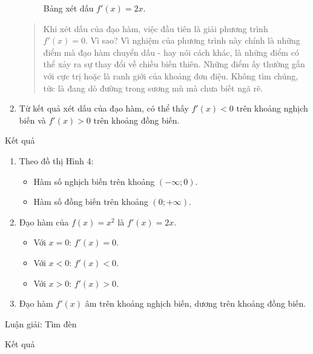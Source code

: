 \documentclass[
]{article}
\providecommand{\tightlist}{%
  \setlength{\itemsep}{0pt}\setlength{\parskip}{0pt}}\usepackage{longtable,booktabs,array}
\begin{document}
\begin{enumerate}
\begin{figure}[H]
{  }

  \caption{Bảng xét dấu \(f'(x)=2x\).}

  \end{figure}%

  \begin{quote}
  Khi xét dấu của đạo hàm, việc đầu tiên là giải phương trình
  \(f'(x) = 0\). Vì sao? Vì nghiệm của phương trình này chính là những
  điểm mà đạo hàm chuyển dấu - hay nói cách khác, là những điểm có thể
  xảy ra sự thay đổi về chiều biến thiên. Những điểm ấy thường gắn với
  cực trị hoặc là ranh giới của khoảng đơn điệu. Không tìm chúng, tức là
  đang dò đường trong sương mù mà chưa biết ngã rẽ.
  \end{quote}
\item
  Từ kết quả xét dấu của đạo hàm, có thể thấy \(f'(x)<0\) trên khoảng
  nghịch biến và \(f'(x)>0\) trên khoảng đồng biến.
\end{enumerate}

Kết quả

\begin{enumerate}
\def\labelenumi{\alph{enumi}.}
\tightlist
\item
  Theo đồ thị Hình 4:

  \begin{itemize}
  \tightlist
  \item
    Hàm số nghịch biến trên khoảng \((-\infty;0)\).
  \item
    Hàm số đồng biến trên khoảng \((0;+\infty)\).
  \end{itemize}
\item
  Đạo hàm của \(f(x)=x^2\) là \(f'(x)=2x\).

  \begin{itemize}
  \tightlist
  \item
    Với \(x = 0\): \(f'(x) = 0\).
  \item
    Với \(x < 0\): \(f'(x) < 0\).
  \item
    Với \(x > 0\): \(f'(x) > 0\).
  \end{itemize}
\item
  Đạo hàm \(f'(x)\) âm trên khoảng nghịch biến, dương trên khoảng đồng
  biến.
\end{enumerate}

Luận giải: Tìm đèn

Kết quả
\end{document}

